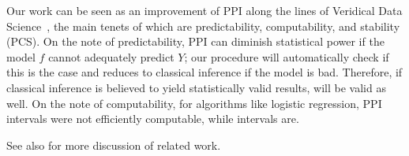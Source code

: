 Our work can be seen as an improvement of PPI along the lines of Veridical Data Science~\cite{Yu18, YuKumbier20, YuBa24}, the main tenets of which are predictability, computability, and stability (PCS).
%
On the note of predictability, PPI can diminish statistical power if the model $f$ cannot adequately predict $Y$; our procedure will automatically check if this is the case and reduces to classical inference if the model is bad. Therefore, if classical inference is believed to yield statistically valid results, \ppipp will be valid as well.
%
On the note of computability, for algorithms like logistic regression, PPI intervals were not efficiently computable, while \ppipp intervals are.


See also \citet{AngelopoulosBaFaJoZr23} for more discussion of related work.

